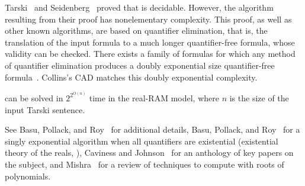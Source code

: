 Tarski~\cite{T51} and Seidenberg~\cite{Sei74} proved that \FOTR{} is decidable.
However, the algorithm resulting from their proof has nonelementary complexity.
%
This proof, as well as other known algorithms, are based on quantifier
elimination, that is, the translation of the input formula to a much longer
quantifier-free formula, whose validity can be checked.
There exists a family of formulas for which any method of quantifier elimination
produces a doubly exponential size quantifier-free formula~\cite{DH88}.
%
Collins's CAD matches this doubly exponential complexity.
\begin{theorem}
	\FOTR{} can be solved in $2^{2^{O(n)}}$ time in the real-RAM model, where
	\(n\) is the size of the input Tarski sentence.
\end{theorem}

See
Basu, Pollack, and Roy~\cite{BPR06} for additional details,
Basu, Pollack, and Roy~\cite{BPR96b} for a singly exponential algorithm when all
quantifiers are existential
(existential theory of the reals, \ETR{}),
Caviness and Johnson~\cite{CJ12} for an anthology of key papers on the subject,
and Mishra~\cite{M04} for a review of techniques to compute with roots of
polynomials.

